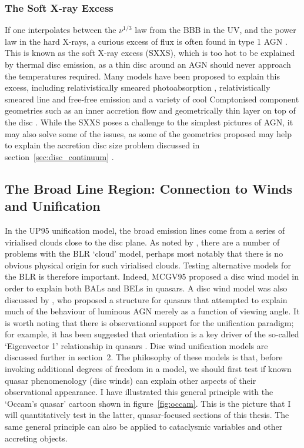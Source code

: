 \subsubsection{The Soft X-ray Excess}
\label{sec:sxxs}

If one interpolates between the $\nu^{1/3}$ law from the BBB in the UV, and the power law
in the hard X-rays, a curious excess of flux is often found
in type 1 AGN \citep[see figure~\ref{fig:quasar_sed}, and][]{koratkar1999}. 
This is known as the soft X-ray excess (SXXS), which is too 
hot to be explained by thermal disc emission, as a thin disc around an AGN should
never approach the temperatures required. Many models have been proposed to
explain this excess, including relativistically smeared 
photoabsorption \citep{gierlinskidone2004b,gierlinskidone2006}, 
relativistically smeared line and 
free-free emission \citep{rossfabian2005,crummy2006} 
and a variety of cool Comptonised component geometries such as an 
inner accretion flow \citep{magdiarz1998,done2012} 
and geometrically thin layer on top of the disc \citep{januik2001}. 
While the SXXS poses a challenge to
the simplest pictures of AGN, it may also solve some of the issues, as
some of the geometries proposed may help to explain the 
accretion disc size problem discussed in 
section~\ref{sec:disc_continuum} \citep{gardnerdone2016}.

\subsection{The Broad Line Region: Connection to Winds and Unification}

In the UP95 unification model, the broad emission lines
come from a series of virialised clouds close to the disc plane.
As noted by \citet[][hereafter MCGV95]{MCGV95}, there are a number of problems with
the BLR `cloud' model, perhaps most notably that there is no obvious 
physical origin for such virialised clouds. 
Testing alternative models for the BLR is therefore important.
Indeed, MCGV95 proposed a disc wind model in order to explain both BALs and BELs
in quasars. A disc wind model was also  discussed by \cite{elvis2000}, 
who proposed a structure for quasars that attempted to explain much 
of the behaviour of luminous AGN
merely as a function of viewing angle. It is worth noting that
there is observational support for the unification paradigm; for example,
it has been suggested that orientation is a key driver of the so-called
`Eigenvector 1' relationship in quasars 
\citep{borosongreen,sulentic2000ev1,marziani2001,shenho2014}.
Disc wind unification models are discussed further in section~2.
The philosophy of these models is that, before invoking additional
degrees of freedom in a model, we should first test if known quasar phenomenology 
(disc winds) can explain other aspects of their observational appearance.
I have illustrated this general principle with the `Occam's quasar' 
cartoon shown in figure~\ref{fig:occam}. This is the picture that I will
quantitatively test in the latter, quasar-focused sections of this thesis.
The same general principle can also be applied to cataclysmic variables 
and other accreting objects.


